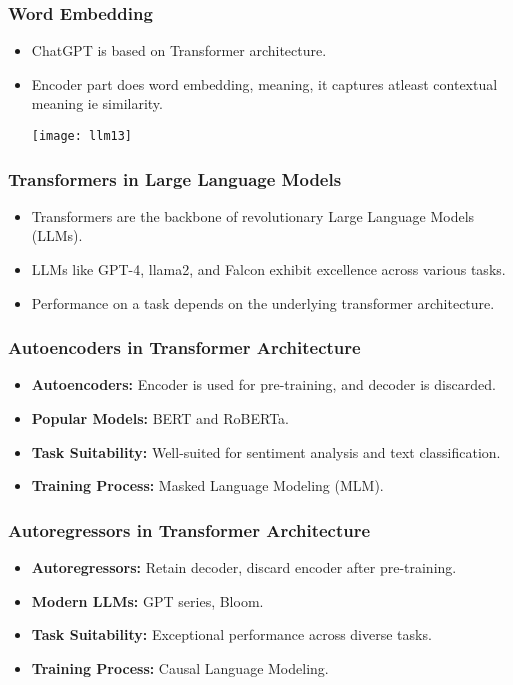 \begin{frame}[fragile]\frametitle{Word Embedding}

\begin{itemize}
\item ChatGPT is based on Transformer architecture.
\item Encoder part does word embedding, meaning, it captures atleast contextual meaning ie similarity.

\begin{center}
\texttt{[image: llm13]}
\end{center}

\end{itemize}

\end{frame}

\begin{frame}[fragile]\frametitle{Transformers in Large Language Models}
\begin{itemize}
    \item Transformers are the backbone of revolutionary Large Language Models (LLMs).
    \item LLMs like GPT-4, llama2, and Falcon exhibit excellence across various tasks.
    \item Performance on a task depends on the underlying transformer architecture.
\end{itemize}
\end{frame}

\begin{frame}[fragile]\frametitle{Autoencoders in Transformer Architecture}
\begin{itemize}
    \item \textbf{Autoencoders:} Encoder is used for pre-training, and decoder is discarded.
    \item \textbf{Popular Models:} BERT and RoBERTa.
    \item \textbf{Task Suitability:} Well-suited for sentiment analysis and text classification.
    \item \textbf{Training Process:} Masked Language Modeling (MLM).
\end{itemize}
\end{frame}

\begin{frame}[fragile]\frametitle{Autoregressors in Transformer Architecture}
\begin{itemize}
    \item \textbf{Autoregressors:} Retain decoder, discard encoder after pre-training.
    \item \textbf{Modern LLMs:} GPT series, Bloom.
    \item \textbf{Task Suitability:} Exceptional performance across diverse tasks.
    \item \textbf{Training Process:} Causal Language Modeling.
\end{itemize}
\end{frame}

